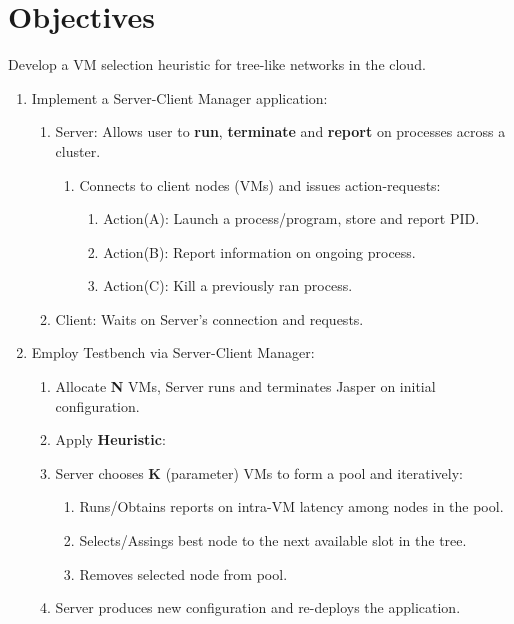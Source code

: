 \documentclass{article}
\begin{document}
\section{Objectives}
Develop a VM selection heuristic for tree-like networks in the cloud.
\begin{enumerate}
    \item Implement a Server-Client Manager application:
    \begin{enumerate}
        \item Server: Allows user to \textbf{run}, \textbf{terminate} and \textbf{report} on processes across a cluster.        
        \begin{enumerate}
            \item Connects to client nodes (VMs) and issues action-requests:
            \begin{enumerate}
                \item Action(A): Launch a process/program, store and report PID.
                \item Action(B): Report information on ongoing process.
                \item Action(C): Kill a previously ran process.
            \end{enumerate}
        \end{enumerate}
        \item Client: Waits on Server's connection and requests.
    \end{enumerate}
    \item Employ Testbench via Server-Client Manager:
    \begin{enumerate}
        \item Allocate \textbf{N} VMs, Server runs and terminates Jasper on initial configuration.
        \item Apply \textbf{Heuristic}:
        \item Server chooses \textbf{K} (parameter) VMs to form a pool and iteratively:
            \begin{enumerate}
                \item Runs/Obtains reports on intra-VM latency among nodes in the pool.
                \item Selects/Assings best node to the next available slot in the tree.
                \item Removes selected node from pool.
            \end{enumerate}
        \item Server produces new configuration and re-deploys the application.
    \end{enumerate}
\end{enumerate}
\end{document}
